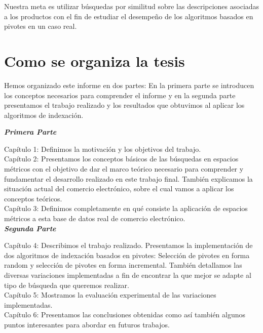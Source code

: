 Nuestra meta es utilizar b\'usquedas por similitud sobre las descripciones asociadas a los productos con el fin de estudiar el desempeño de los algoritmos basados en pivotes en un caso real. 

\section{Como se organiza la tesis}

Hemos organizado este informe en dos partes: En la primera parte se introducen los conceptos necesarios para comprender el informe y en la segunda parte presentamos el trabajo realizado y los resultados que obtuvimos al aplicar los algoritmos de indexaci\'on.

\noindent \textbf{\textit{Primera Parte}}

\noindent Cap\'itulo 1: Definimos la motivaci\'on y los objetivos del trabajo.\\

\noindent Cap\'itulo 2: Presentamos los conceptos b\'asicos de las b\'usquedas en espacios m\'etricos con el objetivo de dar el marco te\'orico necesario para comprender y fundamentar el desarrollo realizado en este trabajo final. Tambi\'en explicamos la situaci\'on actual del comercio electr\'onico, sobre el cual vamos a aplicar los conceptos te\'oricos.\\

\noindent Cap\'itulo 3: Definimos completamente en qu\'e consiste la aplicaci\'on de espacios m\'etricos a esta base de datos real de comercio electr\'onico.\\

\noindent \textbf{\textit{Segunda Parte}}

\noindent Cap\'itulo 4: Describimos el trabajo realizado. Presentamos la implementaci\'on de dos algoritmos de indexaci\'on basados en pivotes: Selecci\'on de pivotes en forma random y selecci\'on de pivotes en forma incremental. Tambi\'en detallamos las diversas variaciones implementadas a fin de encontrar la que mejor se adapte al tipo de b\'usqueda que queremos realizar.\\

\noindent Cap\'itulo 5: Mostramos la evaluaci\'on experimental de las variaciones implementadas.\\

\noindent Cap\'itulo 6: Presentamos las conclusiones obtenidas como as\'i tambi\'en algunos puntos interesantes para abordar en futuros trabajos.\\

